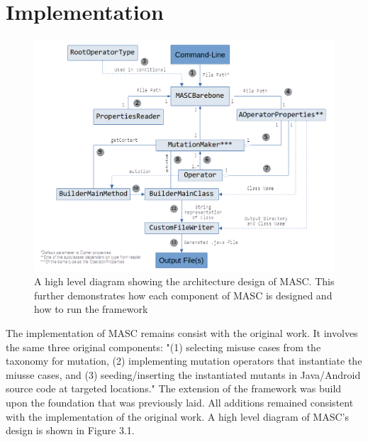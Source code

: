 \chapter{Implementation}
\label{chap_implementation}

\begin{figure}[!ht]
	\centering
    \includegraphics[width=0.96\linewidth]{figures/architecture.png}
	\vspace{-1.em}
    \caption{\small A high level diagram showing the architecture design of MASC. This further demonstrates how each component of MASC is designed and how to run the framework}
    \label{fig:taxonomy}
	
\end{figure}

The implementation of MASC remains consist with the original work. It involves the same three original components: "(1) selecting misuse cases from the taxonomy for mutation, (2) implementing mutation operators that instantiate the miusse cases, and (3) seeding/inserting the instantiated mutants in Java/Android source code at targeted locations." The extension of the framework was build upon the foundation that was previously laid. All additions remained consistent with the implementation of the original work. A high level diagram of MASC's design is shown in Figure 3.1.

